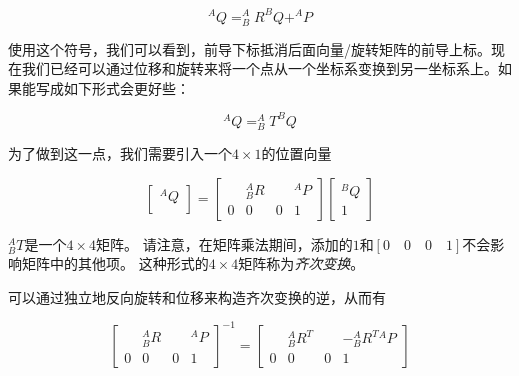 \begin{equation}
^AQ=^A_BR^BQ+^AP
\end{equation}

使用这个符号，我们可以看到，前导下标抵消后面向量/旋转矩阵的前导上标。现在我们已经可以通过位移和旋转来将一个点从一个坐标系变换到另一坐标系上。如果能写成如下形式会更好些：

\begin{equation}
^AQ=^A_BT^BQ
\end{equation}

为了做到这一点，我们需要引入一个$4\times1$的位置向量

\begin{equation}
\left[\begin{array}{c}^AQ\\\end{array}\right]=\left[\begin{array}{ccc|c} & ^A_BR & & ^AP \\\hline 0 & 0 & 0 & 1\end{array}\right]\left[\begin{array}{c}^BQ\\1\end{array}\right]
\end{equation}

$^A_BT$是一个$4\times 4$矩阵。 请注意，在矩阵乘法期间，添加的$1$和$[0\quad 0\quad 0\quad 1]$不会影响矩阵中的其他项。 这种形式的$4\times 4$矩阵称为\emph{齐次变换}。


可以通过独立地反向旋转和位移来构造齐次变换的逆，从而有

\begin{equation}
\left[\begin{array}{ccc|c} & ^A_BR & & ^AP \\\hline 0 & 0 & 0 & 1\end{array}\right]^{-1}=
\left[\begin{array}{ccc|c} & ^A_BR^T & & -^A_B{R^T}{^AP} \\\hline 0 & 0 & 0 & 1\end{array}\right]
\end{equation}

